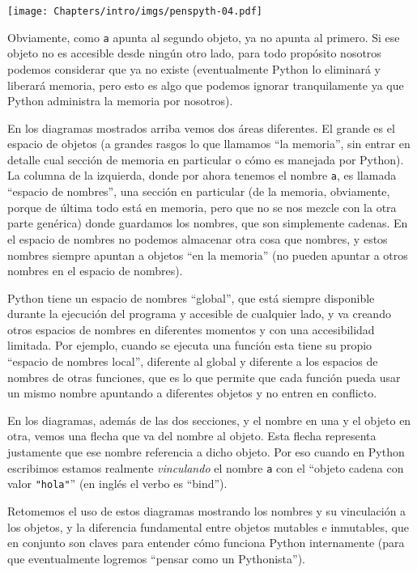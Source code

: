 \begin{center}
    \texttt{[image: Chapters/intro/imgs/penspyth-04.pdf]}
\end{center}

Obviamente, como \verb|a| apunta al segundo objeto, ya no apunta al primero. Si ese objeto no es accesible desde ningún otro lado, para todo propósito nosotros podemos considerar que ya no existe (eventualmente Python lo eliminará y liberará memoria, pero esto es algo que podemos ignorar tranquilamente ya que Python administra la memoria por nosotros).

En los diagramas mostrados arriba vemos dos áreas diferentes. El grande es el espacio de objetos (a grandes rasgos lo que llamamos ``la memoria'', sin entrar en detalle cual sección de memoria en particular o cómo es manejada por Python). La columna de la izquierda, donde por ahora tenemos el nombre \verb|a|, es llamada ``espacio de nombres'', una sección en particular (de la memoria, obviamente, porque de última todo está en memoria, pero que no se nos mezcle con la otra parte genérica) donde guardamos los nombres, que son simplemente cadenas. En el espacio de nombres no podemos almacenar otra cosa que nombres, y estos nombres siempre apuntan a objetos ``en la memoria'' (no pueden apuntar a otros nombres en el espacio de nombres).

Python tiene un espacio de nombres ``global'', que está siempre disponible durante la ejecución del programa y accesible de cualquier lado, y va creando otros espacios de nombres en diferentes momentos y con una accesibilidad limitada. Por ejemplo, cuando se ejecuta una función esta tiene su propio ``espacio de nombres local'', diferente al global y diferente a los espacios de nombres de otras funciones, que es lo que permite que cada función pueda usar un mismo nombre apuntando a diferentes objetos y no entren en conflicto. 

En los diagramas, además de las dos secciones, y el nombre en una y el objeto en otra, vemos una flecha que va del nombre al objeto. Esta flecha representa justamente que ese nombre referencia a dicho objeto. Por eso cuando en Python escribimos  estamos realmente \textit{vinculando} el nombre \verb|a| con el ``objeto cadena con valor \verb|"hola"|'' (en inglés el verbo es ``bind'').

Retomemos el uso de estos diagramas mostrando los nombres y su vinculación a los objetos, y la diferencia fundamental entre objetos mutables e inmutables, que en conjunto son claves para entender cómo funciona Python internamente (para que eventualmente logremos ``pensar como un Pythonista''). 

